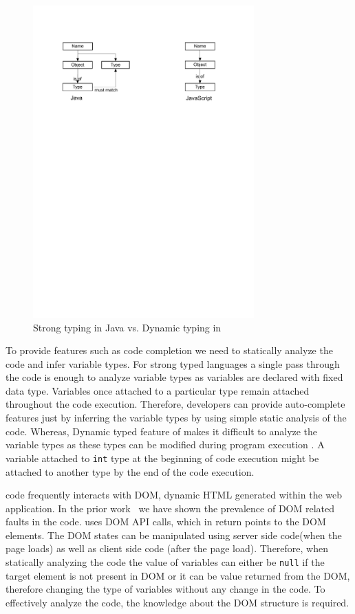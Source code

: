 		\begin{figure}
			\centering
			\includegraphics[width=85mm]{images/typing.pdf}
			\caption{Strong typing in Java vs. Dynamic typing in \javascript}
			\label{Fig:Typing}
		\end{figure}
		
		To provide features such as code completion we need to statically analyze the code and infer variable types. For strong typed languages a single pass through the code is enough to analyze variable types as variables are declared with fixed data type. Variables once attached to a particular type remain attached throughout the code execution. Therefore, developers can provide auto-complete features just by inferring the variable types by using simple static analysis of the code. Whereas, Dynamic typed feature of \javascript makes it difficult to analyze the variable types as these types can be modified during program execution \cite{hackett2012fast, kashyap2013type}. A variable attached to \texttt{int} type at the beginning of code execution might be attached to another type by the end of the code execution. 

	
	 \javascript code frequently interacts with DOM, \ie dynamic HTML generated within the web application. In the prior work~\cite{ocariza2013empirical} we have shown the prevalence of DOM related faults in the \javascript  code. \javascript uses DOM API calls, which in return points to the DOM elements. The DOM states can be manipulated using server side code(when the page loads) as well as client side code (after the page load). Therefore, when statically analyzing the \javascript code the value of variables can either be \texttt{null} if the target element is not present in DOM or it can be value returned from the DOM, therefore changing the type of \javascript variables without any change in the \javascript code. To effectively analyze the \javascript code, the knowledge about the DOM structure is required. 
	
